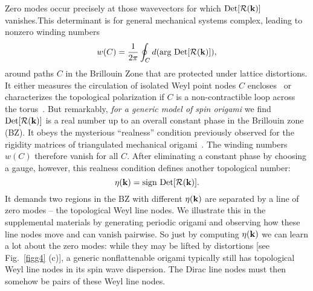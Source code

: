 \documentclass[a4paper,aps,prl,twocolumn,floatfix,showpacs,superscriptaddress]{revtex4-1}
\begin{document}
Zero modes occur precisely at those wavevectors for which $\text{Det}[ {\bf \mathcal{R}}({\bf k})]$ vanishes.This determinant is for general mechanical systems complex, leading to nonzero winding numbers
\begin{equation}
  w(C) = \frac{1}{2\pi} \oint_C d (\text{arg}\ \text{Det}[ {\bf \mathcal{R}}({\bf k})]),
  \label{eq:wind}
\end{equation}
around paths $C$ in the Brillouin Zone that are protected under lattice distortions. It either measures the circulation of isolated Weyl point nodes $C$ encloses~\cite{po2016phonon, rocklin2016mechanical} or characterizes the topological polarization if $C$ is a non-contractible loop across the torus~\cite{kane2014topological}. But remarkably, {\it for a generic model of spin origami} we find $\text{Det}[ {\bf \mathcal{R}}({\bf k})]$ is a real number up to an overall constant phase in the Brillouin zone (BZ). It obeys the mysterious ``realness'' condition previously observed for the rigidity matrices of triangulated mechanical origami~\cite{chen2016topological}. The winding numbers $w(C)$ therefore vanish for all $C$. After eliminating a constant phase by choosing a gauge, however, this realness condition defines another topological number:
\begin{equation}
  \eta({\bf k}) = \text{sign}\ \text{Det} [\mathcal{R}({\bf k})].
  \label{eq:topo}
\end{equation}
It demands two regions in the BZ with different $\eta({\bf k})$ are separated by a line of zero modes -- the topological Weyl line nodes. We illustrate this in the supplemental materials by generating periodic origami and observing how these line nodes move and can vanish pairwise. So just by computing $\eta({\bf k})$ we can learn a lot about the zero modes: while they may be lifted by distortions [see Fig.~\ref{figg4} (c)], a generic nonflattenable origami typically still has topological Weyl line nodes in its spin wave dispersion. The Dirac line nodes must then somehow be pairs of these Weyl line nodes.
\end{document}
